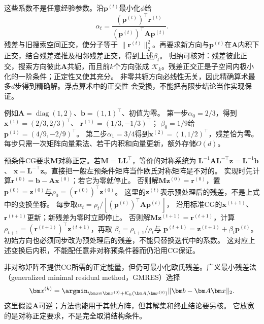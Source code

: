 这些系数不是任意经验参数。沿$\bm p^{(t)}$最小化$\phi$给
\[
 \alpha_t=\frac{(\bm p^{(t)})^\top\bm r^{(t)}}
                 {(\bm p^{(t)})^\top\bm A\bm p^{(t)}}.
\]
残差与旧搜索空间正交，使分子等于
$\lVert\bm r^{(t)}\rVert_2^2$。再要求新方向与$\bm p^{(t)}$在$\bm A$内积下
正交，结合残差递推及相邻残差正交，得到上述$\beta_t$。
归纳可核对：残差彼此正交，搜索方向彼此$\bm A$共轭，而且前$k$个方向张成
$\mathcal K_k$。残差正交正是子空间内极小化的一阶条件；正定性又使其充分。
非零共轭方向必线性无关，因此精确算术最多$d$步得到精确解。浮点算术中的正交性
会受损，不能把有限步结论当作实现保证。

例如$\bm A=\operatorname{diag}(1,2)$、$\bm b=(1,1)^\top$、初值为零。
第一步$\alpha_0=2/3$，得到
$\bm x^{(1)}=(2/3,2/3)^\top$、
$\bm r^{(1)}=(1/3,-1/3)^\top$；
$\beta_0=1/9$给$\bm p^{(1)}=(4/9,-2/9)^\top$。
第二步$\alpha_1=3/4$得到$\bm x^{(2)}=(1,1/2)^\top$，残差恰为零。
每步只需一次矩阵向量乘法、若干内积和向量更新，额外存储$O(d)$。

预条件CG要求$\bm M$对称正定。若$\bm M=\bm L\bm L^\top$，等价的对称系统为
$\bm L^{-1}\bm A\bm L^{-\top}\bm z=\bm L^{-1}\bm b$、
$\bm x=\bm L^{-\top}\bm z$。直接把一般左预条件矩阵当作欧氏对称矩阵是不对的。
实现时先计算$\bm r^{(0)}=\bm b-\bm A\bm x^{(0)}$；若它为零就停止。
否则解$\bm M\bm z^{(0)}=\bm r^{(0)}$，置
$\bm p^{(0)}=\bm z^{(0)}$与$\rho_0=(\bm r^{(0)})^\top\bm z^{(0)}$。
这里的$\bm z^{(t)}$表示预处理后的残差，不是上式中的变换坐标。
每步取$\alpha_t=\rho_t/[(\bm p^{(t)})^\top\bm A\bm p^{(t)}]$，
沿用标准CG的$\bm x^{(t+1)}$、$\bm r^{(t+1)}$更新；新残差为零时立即停止。
否则解$\bm M\bm z^{(t+1)}=\bm r^{(t+1)}$，计算
$\rho_{t+1}=(\bm r^{(t+1)})^\top\bm z^{(t+1)}$，再取
$\beta_t=\rho_{t+1}/\rho_t$与
$\bm p^{(t+1)}=\bm z^{(t+1)}+\beta_t\bm p^{(t)}$。
初始方向也必须同步改为预处理后的残差，不能只替换迭代中的系数。
这对应上述变换后内积，不能配任意非对称预条件器而仍沿用CG保证。


非对称矩阵不提供CG所需的正定能量，但仍可最小化欧氏残差。广义最小残差法
（generalized minimal residual method，GMRES）选择
\[
 \bm x^{(k)}
 =\argmin_{\bm x\in\bm x^{(0)}+\mathcal K_k(\bm A,\bm r^{(0)})}
      \lVert\bm b-\bm A\bm x\rVert_2.
\]
这里假设$\bm A$可逆；方法也能用于其他方阵，但其解集和终止结论要另核。
它放宽的是对称正定要求，不是完全取消结构条件。

